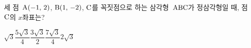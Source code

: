 세 점~$\mathrm{A}(-1,\,2)$, $\mathrm{B}(1,\,-2)$, $\mathrm{C}$를 꼭짓점으로 하는 삼각형~$\mathrm{ABC}$가 정삼각형일 때, 점~$\mathrm{C}$의 $x$좌표는? 
\begin{choices32}{$\sqrt{3}$}{$\dfrac{5\sqrt{3}}{4}$}{$\dfrac{3\sqrt{3}}{2}$}{$\dfrac{7\sqrt{3}}{4}$}{$2\sqrt{3}$}\end{choices32}
